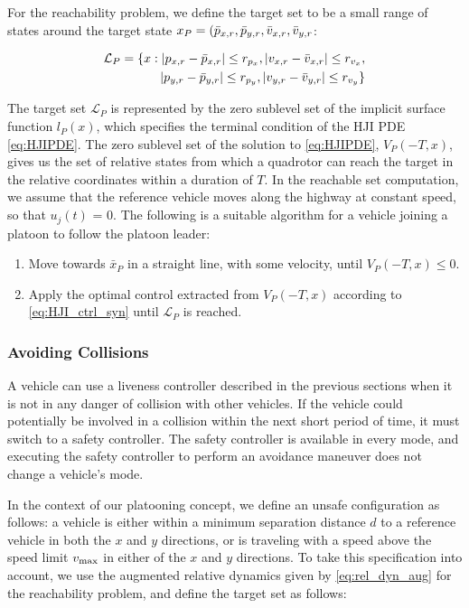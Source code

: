 For the reachability problem, we define the target set to be a small range of states around the target state $x_P = (\bar{p}_{x,r}, \bar{p}_{y,r}, \bar{v}_{x,r}, \bar{v}_{y,r}$:

\begin{equation}
\begin{aligned}
\mathcal{L}_P = \{x: |p_{x,r}-\bar{p}_{x,r}|\le r_{p_x}, |v_{x,r}-\bar{v}_{x,r}|\le r_{v_x}, \\
|p_{y,r} - \bar{p}_{y,r}| \le r_{p_y}, |v_{y,r} - \bar{v}_{y,r}|\le r_{v_y} \}
\end{aligned}
\end{equation}

The target set $\mathcal{L}_P$ is represented by the zero sublevel set of the implicit surface function $l_P(x)$, which specifies the terminal condition of the HJI PDE \eqref{eq:HJIPDE}. The zero sublevel set of the solution to \eqref{eq:HJIPDE}, $V_P(-T,x)$, gives us the set of relative states from which a quadrotor can reach the target in the relative coordinates within a duration of $T$. In the reachable set computation, we assume that the reference vehicle moves along the highway at constant speed, so that $u_j(t)$ = 0. The following is a suitable algorithm for a vehicle joining a platoon to follow the platoon leader:

\begin{enumerate}
\item Move towards $\bar{x}_P$ in a straight line, with some velocity, until $V_P(-T,x)\le 0$.
\item Apply the optimal control extracted from $V_P(-T,x)$ according to \eqref{eq:HJI_ctrl_syn} until $\mathcal{L}_P$ is reached.
\end{enumerate}

\subsubsection{Avoiding Collisions \label{sec:collision_ctrl}}
A vehicle can use a liveness controller described in the previous sections when it is not in any danger of collision with other vehicles. If the vehicle could potentially be involved in a collision within the next short period of time, it must switch to a safety controller. The safety controller is available in every mode, and executing the safety controller to perform an avoidance maneuver does not change a vehicle's mode. 

In the context of our platooning concept, we define an unsafe configuration as follows: a vehicle is either within a minimum separation distance $d$ to a reference vehicle in both the $x$ and $y$ directions, or is traveling with a speed above the speed limit $v_\text{max}$ in either of the $x$ and $y$ directions. To take this specification into account, we use the augmented relative dynamics given by \eqref{eq:rel_dyn_aug} for the reachability problem, and define the target set as follows:

